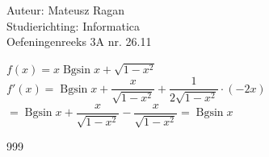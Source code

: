 \documentclass[a4paper]{article}
\begin{document}
\noindent \large Auteur: Mateusz Ragan \\
\noindent \large Studierichting: Informatica\\
\noindent \large Oefeningenreeks 3A nr. 26.11\\

\medskip

\normalsize

$f(x) = x\operatorname{Bgsin} x + \sqrt{1-x^2}$\\

$f'(x) = \operatorname{Bgsin} x + \dfrac{x}{\sqrt{1-x^2}} + \dfrac{1}{2\sqrt{1-x^2}} \cdot (-2x)$\\

$= \operatorname{Bgsin} x + \dfrac{x}{\sqrt{1-x^2}}-\dfrac{x}{\sqrt{1-x^2}} = \operatorname{Bgsin} x$



\begin{thebibliography}{999}
\end{thebibliography}
\end{document}
